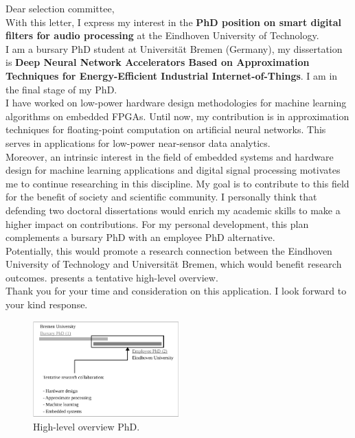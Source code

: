 \hfill\begin{minipage}{\linewidth}
	Dear selection committee,
	\\
	
	With this letter, I express my interest in the \textbf{PhD position on smart digital filters for audio processing} at the Eindhoven University of Technology.
	\\
	
	I am a bursary PhD student at Universit\"at Bremen (Germany), my dissertation is \textbf{Deep Neural Network Accelerators Based on Approximation Techniques for Energy-Efficient Industrial Internet-of-Things}. I am in the final stage of my PhD.
	\\
	
	I have worked on low-power hardware design methodologies for machine learning algorithms on embedded FPGAs. Until now, my contribution is in approximation techniques for floating-point computation on artificial neural networks. This serves in applications for low-power near-sensor data analytics.	
	\\
	
	Moreover, an intrinsic interest in the field of embedded systems and hardware design for machine learning applications and digital signal processing motivates me to continue researching in this discipline. My goal is to contribute to this field for the benefit of society and scientific community. I personally think that defending two doctoral dissertations would enrich my academic skills to make a higher impact on contributions. For my personal development, this plan complements a bursary PhD with an employee PhD alternative.
	\\
	
	Potentially, this would promote a research connection between the Eindhoven University of Technology and Universit\"at Bremen, which would benefit research outcomes.  presents a tentative high-level overview.
	\\
	
	Thank you for your time and consideration on this application. I look forward to your kind response.
	
\end{minipage}

\begin{figure}[h!]
	\centering
	\includegraphics[width=0.5\textwidth]{../figures/double_phd_plan.pdf}
	\caption{High-level overview PhD.}
	\label{fig:workflow}
\end{figure}